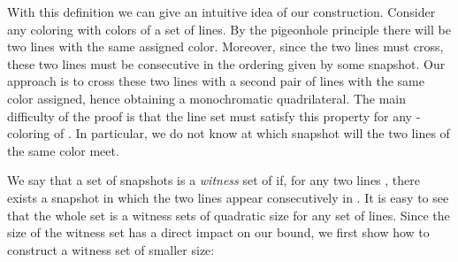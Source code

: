 \documentclass[11pt,a4paper]{article}
\begin{document}
With this definition we can give an intuitive idea of our construction. Consider any coloring with  colors of a set of  lines. By the pigeonhole principle there will be two lines with the same assigned color. Moreover, since the two lines must cross, these two lines must be consecutive in the ordering given by some snapshot. Our approach is to cross these two lines with a second pair of lines with the same color assigned, hence obtaining a monochromatic quadrilateral. The main difficulty of the proof is that the line set must satisfy this property for any -coloring of . In particular, we do not know at which snapshot will the two lines of the same color meet.

We say that a set of snapshots  is a {\em witness} set of  if, for any two lines , there exists a snapshot  in which the two lines appear consecutively in . It is easy to see that the whole set  is a witness sets of quadratic size for any set of lines. Since the size of the witness set has a direct impact on our bound, we first show how to construct a witness set of smaller size:
\end{document}

